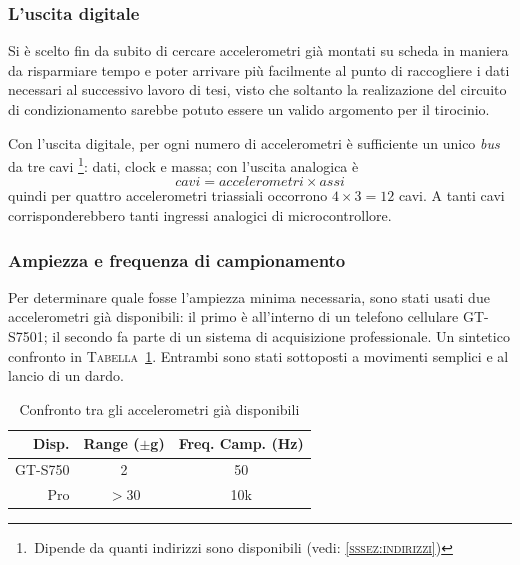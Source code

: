     \subsubsection {L'uscita digitale} \label{sssez:digitale}
    Si è scelto fin da subito di cercare accelerometri già montati su scheda
    in maniera da risparmiare tempo e poter arrivare più facilmente
    al punto di raccogliere i dati necessari al successivo lavoro di tesi,
    visto che soltanto la realizazione del circuito di condizionamento
    sarebbe potuto essere un valido argomento per il tirocinio.
	
    Con l'uscita digitale, per ogni numero di accelerometri
    è sufficiente un unico \textit{bus} da tre cavi
	\footnote{\,Dipende da quanti indirizzi sono disponibili
	(vedi: \textsc{\ref{sssez:indirizzi}})}:
	dati, clock e massa;
    con l'uscita analogica è
\[
	cavi = accelerometri \times assi
\]
    quindi per quattro accelerometri triassiali occorrono
    \(4 \times 3  = 12\) cavi.
    A tanti cavi corrisponderebbero tanti ingressi analogici di microcontrollore.
    

    \subsubsection {Ampiezza e frequenza di campionamento} \label{sssez:accmax}
    Per determinare quale fosse l'ampiezza minima necessaria,
    sono stati usati due accelerometri già disponibili:
    il primo è all'interno di un telefono cellulare { GT-S7501};
    il secondo fa parte di un sistema di acquisizione professionale.
    Un sintetico confronto in { \textsc{Tabella~\ref{tab:accelerometricasa}}}.
    Entrambi sono stati sottoposti a movimenti semplici e
    al lancio di un dardo.
	\begin{table}
	  \begin{center}
		\caption{Confronto tra gli accelerometri già disponibili}
		\label{tab:accelerometricasa}
		\begin{tabular}{r c c}
Disp.   & Range ($\pm$g) & Freq. Camp. (Hz)\\
			\hline
GT-S750 & 2              & 50 \\
Pro     & $>$30          & 10k \\
			\hline
		\end{tabular}
	  \end{center}
	\end{table}
        
